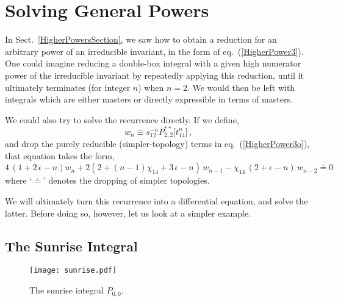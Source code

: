 \documentclass[aps,prd,preprint,groupedaddress,nofootinbib,showpacs,eqsecnum]{revtex4}
\def\sect#1{Sect.~{\ref{#1}}}
\def\eqn#1{eq.~(\ref{#1})}
\def\eps{\epsilon}
\def\Pn#1#2{P_{#1,#2}}
\def\Pss#1#2{P^{**}_{#1,#2}}
\begin{document}
\section{Solving General Powers}
\label{SolvingGeneralSection}

In \sect{HigherPowersSection}, we saw how to obtain a reduction
for an arbitrary power of an irreducible invariant, in the form
of \eqn{HigherPower3}.  One could imagine reducing a double-box
integral with a given high numerator
power of the irreducible invariant by repeatedly 
applying this reduction, until it ultimately terminates (for
integer $n$) when $n=2$.  We would then be left with 
integrals which are either masters or directly expressible in terms
of masters.

We could also try to solve the recurrence directly.
If we define,
\begin{equation}
w_n \equiv s_{12}^{-n}\Pss22\bigl[t_{14}^n\bigr]\,,
\label{DoubleBoxWDefinition}
\end{equation}
and drop the purely reducible (simpler-topology) terms 
in \eqn{HigherPower3o}, that equation takes the form,
\begin{equation}
{4\,(1+2\,\eps-n)} w_n 
+{2 (2+(n-1)\chi_{14}+3\,\eps-n)}\,w_{n-1}
-{\chi_{14}\,(2+\eps-n)}\,w_{n-2} 
\doteq 0
\label{DoubleBoxRecurrence}
\end{equation}
where `$\doteq$' denotes the dropping of simpler topologies.

We will ultimately turn this recurrence into a differential equation,
and solve the latter.  Before doing so, however, let us 
look at a simpler example.  

\subsection{The Sunrise Integral}

\begin{figure}[ht]
	\centering
	\texttt{[image: sunrise.pdf]}
	\caption{The sunrise integral $\Pn00$.} 
	\label{SunriseFigure}
\end{figure}
\end{document}

